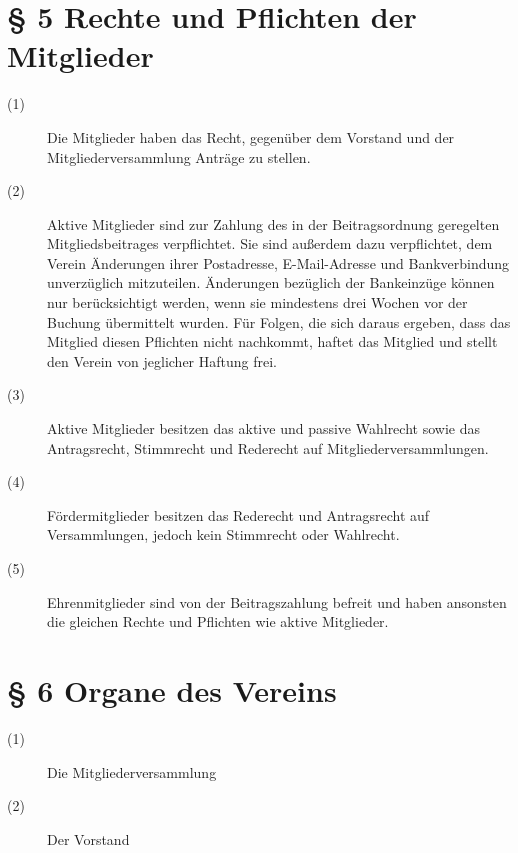 \documentclass[a4paper,12pt]{scrartcl}
\begin{document}
\begin{description}
\end{description}



\section*{\S{} 5 Rechte und Pflichten der Mitglieder}
\begin{description} 

\item[(1)] Die Mitglieder haben das Recht, gegenüber dem Vorstand und der Mitgliederversammlung Anträge zu stellen.
\item[(2)] Aktive Mitglieder sind zur Zahlung des in der Beitragsordnung geregelten Mitgliedsbeitrages verpflichtet. Sie sind außerdem dazu verpflichtet, dem Verein Änderungen ihrer Postadresse, E-Mail-Adresse und Bankverbindung unverzüglich mitzuteilen. Änderungen bezüglich der Bankeinzüge können nur berücksichtigt werden, wenn sie mindestens drei Wochen vor der Buchung übermittelt wurden. Für Folgen, die sich daraus ergeben, dass das Mitglied diesen Pflichten nicht nachkommt, haftet das Mitglied und stellt den Verein von jeglicher Haftung frei.
\item[(3)] Aktive Mitglieder besitzen das aktive und passive Wahlrecht sowie das Antragsrecht, Stimmrecht und Rederecht auf Mitgliederversammlungen.
\item[(4)] Fördermitglieder besitzen das Rederecht und Antragsrecht auf Versammlungen, jedoch kein Stimmrecht oder Wahlrecht.
\item[(5)] Ehrenmitglieder sind von der Beitragszahlung befreit und haben ansonsten die gleichen Rechte und Pflichten wie aktive Mitglieder.

\end{description}



\section*{\S{} 6 Organe des Vereins}
\begin{description} 

\item[(1)] Die Mitgliederversammlung
\item[(2)] Der Vorstand

\end{description}
\end{document}
